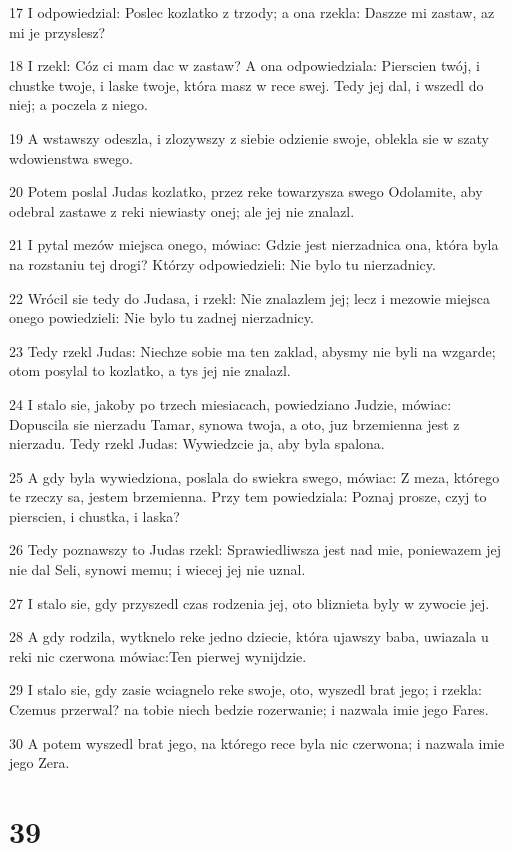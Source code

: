 \par 17 I odpowiedzial: Poslec kozlatko z trzody; a ona rzekla: Daszze mi zastaw, az mi je przyslesz?
\par 18 I rzekl: Cóz ci mam dac w zastaw? A ona odpowiedziala: Pierscien twój, i chustke twoje, i laske twoje, która masz w rece swej. Tedy jej dal, i wszedl do niej; a poczela z niego.
\par 19 A wstawszy odeszla, i zlozywszy z siebie odzienie swoje, oblekla sie w szaty wdowienstwa swego.
\par 20 Potem poslal Judas kozlatko, przez reke towarzysza swego Odolamite, aby odebral zastawe z reki niewiasty onej; ale jej nie znalazl.
\par 21 I pytal mezów miejsca onego, mówiac: Gdzie jest nierzadnica ona, która byla na rozstaniu tej drogi? Którzy odpowiedzieli: Nie bylo tu nierzadnicy.
\par 22 Wrócil sie tedy do Judasa, i rzekl: Nie znalazlem jej; lecz i mezowie miejsca onego powiedzieli: Nie bylo tu zadnej nierzadnicy.
\par 23 Tedy rzekl Judas: Niechze sobie ma ten zaklad, abysmy nie byli na wzgarde; otom posylal to kozlatko, a tys jej nie znalazl.
\par 24 I stalo sie, jakoby po trzech miesiacach, powiedziano Judzie, mówiac: Dopuscila sie nierzadu Tamar, synowa twoja, a oto, juz brzemienna jest z nierzadu. Tedy rzekl Judas: Wywiedzcie ja, aby byla spalona.
\par 25 A gdy byla wywiedziona, poslala do swiekra swego, mówiac: Z meza, którego te rzeczy sa, jestem brzemienna. Przy tem powiedziala: Poznaj prosze, czyj to pierscien, i chustka, i laska?
\par 26 Tedy poznawszy to Judas rzekl: Sprawiedliwsza jest nad mie, poniewazem jej nie dal Seli, synowi memu; i wiecej jej nie uznal.
\par 27 I stalo sie, gdy przyszedl czas rodzenia jej, oto bliznieta byly w zywocie jej.
\par 28 A gdy rodzila, wytknelo reke jedno dziecie, która ujawszy baba, uwiazala u reki nic czerwona mówiac:Ten pierwej wynijdzie.
\par 29 I stalo sie, gdy zasie wciagnelo reke swoje, oto, wyszedl brat jego; i rzekla: Czemus przerwal? na tobie niech bedzie rozerwanie; i nazwala imie jego Fares.
\par 30 A potem wyszedl brat jego, na którego rece byla nic czerwona; i nazwala imie jego Zera.

\chapter{39}

